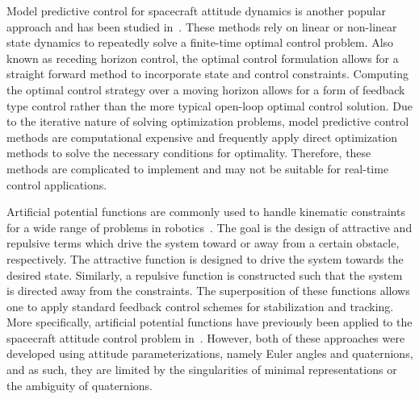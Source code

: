Model predictive control for spacecraft attitude dynamics is another popular approach and has been studied in~\cite{guiggiani2014,kalabic2014,gupta2015}.
These methods rely on linear or non-linear state dynamics to repeatedly solve a finite-time optimal control problem.
Also known as receding horizon control, the optimal control formulation allows for a straight forward method to incorporate state and control constraints.
Computing the optimal control strategy over a moving horizon allows for a form of feedback type control rather than the more typical open-loop optimal control solution.
Due to the iterative nature of solving optimization problems, model predictive control methods are computational expensive and frequently apply direct optimization methods to solve the necessary conditions for optimality.
Therefore, these methods are complicated to implement and may not be suitable for real-time control applications.
  
Artificial potential functions are commonly used to handle kinematic constraints for a wide range of problems in robotics~\cite{rimon1992}.
The goal is the design of attractive and repulsive terms which drive the system toward or away from a certain obstacle, respectively.
The attractive function is designed to drive the system towards the desired state.
Similarly, a repulsive function is constructed such that the system is directed away from the constraints. 
The superposition of these functions allows one to apply standard feedback control schemes for stabilization and tracking.
More specifically, artificial potential functions have previously been applied to the spacecraft attitude control problem in~\cite{lee2011b,mcinnes1994}.
However, both of these approaches were developed using attitude parameterizations, namely Euler angles and quaternions, and as such, they are limited by the singularities of minimal representations or the ambiguity of quaternions.

